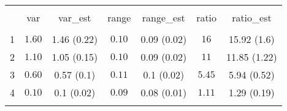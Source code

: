 
\begin{table}[!htbp] \centering 
  \caption{} 
  \label{} 
\begin{tabular}{@{\extracolsep{5pt}} ccccccc} 
\\[-1.8ex]\hline 
\hline \\[-1.8ex] 
 & var & var\_est & range & range\_est & ratio & ratio\_est \\ 
\hline \\[-1.8ex] 
1 & $1.60$ & 1.46 (0.22) & $0.10$ & 0.09 (0.02) & $16$ & 15.92 (1.6) \\ 
2 & $1.10$ & 1.05 (0.15) & $0.10$ & 0.09 (0.02) & $11$ & 11.85 (1.22) \\ 
3 & $0.60$ & 0.57 (0.1) & $0.11$ & 0.1 (0.02) & $5.45$ & 5.94 (0.52) \\ 
4 & $0.10$ & 0.1 (0.02) & $0.09$ & 0.08 (0.01) & $1.11$ & 1.29 (0.19) \\ 
\hline \\[-1.8ex] 
\end{tabular} 
\end{table} 

